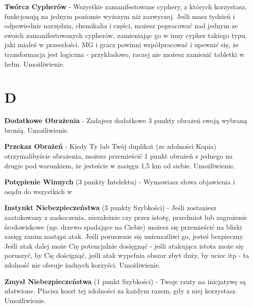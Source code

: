 {\textbf{Twórca Cypherów}\label{sec:Twórca Cypherów} - Wszystkie zamanifestowane cyphery, z których korzystasz, funkcjonują na jednym poziomie wyższym niż zazwyczaj. Jeśli masz tydzień i odpowiednie narzędzia, chemikalia i części, możesz popracować nad jednym ze swoich zamanifestowanych cypherów, zamieniając go w inny cypher takiego typu, jaki miałeś w przeszłości. MG i gracz powinni współpracować i upewnić się, że transformacja jest logiczna - przykładowo, raczej nie możesz zamienić tabletki w hełm. Umożliwienie. 

\section{D}

\textbf{Dodatkowe Obrażenia}\label{sec:Dodatkowe Obrażenia} - Zadajesz dodatkowe 3 punkty obrażeń swoją wybraną bronią. Umożliwienie. 

\textbf{Przekaz Obrażeń}\label{sec:Przekaz Obrażeń} - Kiedy Ty lub Twój duplikat (ze zdolności Kopia) otrzymalibyście obrażenia, możesz przemieścić 1 punkt obrażeń z jednego na drugie pod warunkiem, że jesteście w zasięgu 1,5 km od siebie. Umożliwienie. 

\textbf{Potępienie Winnych}\label{sec:Potępienie Winnych} (3 punkty Intelektu) - Wymawiasz słowa objawienia i osądu do wszystkich w 

\textbf{Instynkt Niebezpieczeństwa}\label{sec:Instynkt Niebezpieczeństwa} (3 punkty Szybkości) - Jeśli zostaniesz zaatakowany z zaskoczenia, niezależnie czy przez istotę, przedmiot lub zagrożenie środowiskowe (np: drzewo spadające na Ciebie) możesz się przemieścić na bliski zasięg zanim nastąpi atak. Jeśli poruszenie się uniemożliwi go, jesteś bezpieczny. Jeśli atak dalej może Cię potencjalnie dosięgnąć - jeśli atakująca istota może się poruszyć, by Cię doścignąć, jeśli atak wypełnia obszar zbyt duży, by uciec itp - ta zdolność nie oferuje żadnych korzyści. Umożliwienie.

\textbf{Zmysł Niebezpieczeństwa}\label{sec:Zmysł Niebezpieczeństwa} (1 punkt Szybkości) - Twoje rzuty na inicjatywę są ułatwione. Płacisz koszt tej zdolności za każdym razem, gdy z niej korzystasz. Umożliwienie.

}
